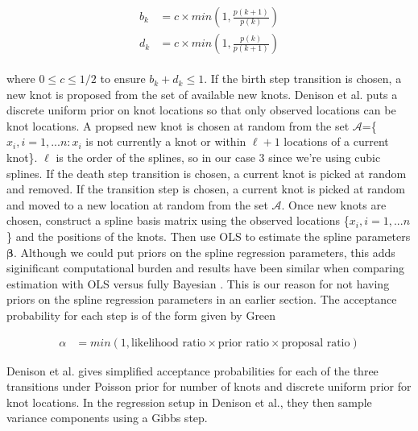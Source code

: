 \documentclass[11pt]{article}\usepackage[]{graphicx}\usepackage[]{color}
\begin{document}
\begin{align}
\begin{split}
\label{knotproposal}
b_k &= c \times min\left(1, \frac{p(k+1)}{p(k)} \right) \\
d_k &= c \times min\left(1, \frac{p(k)}{p(k+1)} \right) 
\end{split}
\end{align}

where $0\leq c \leq 1/2$ to ensure $b_k+d_k \leq 1$. If the birth step transition is chosen, a new knot is proposed from the set of available new knots. Denison et al. puts a discrete uniform prior on knot locations so that only observed locations can be knot locations.  A propsed new knot is chosen at random from the set $\mathcal{A}$=\{$x_i,i=1,...n:x_i$ is not currently a knot or within $\ell+1$ locations of a current knot\}. $\ell$ is the order of the splines, so in our case 3 since we're using cubic splines. If the death step transition is chosen, a current knot is picked at random and removed. If the transition step is chosen, a current knot is picked at random and moved to a new location at random from the set $\mathcal{A}$. Once new knots are chosen, construct a spline basis matrix using the observed locations \{$x_i,i=1,...n$\} and the positions of the knots. Then use OLS to estimate the spline parameters $\boldsymbol{\beta}$. Although we could put priors on the spline regression parameters, this adds siginificant computational burden and results have been similar when comparing estimation with OLS versus fully Bayesian \cite{denison}. This is our reason for not having priors on the spline regression parameters in an earlier section. The acceptance probability for each step is of the form given by Green

\begin{align}
\alpha &= min(1, \text{likelihood ratio} \times \text{prior ratio} \times \text{proposal ratio})
\end{align}

Denison et al. gives simplified acceptance probabilities for each of the three transitions under Poisson prior for number of knots and discrete uniform prior for knot locations. In the regression setup in Denison et al., they then sample variance components using a Gibbs step. %

\end{document}
